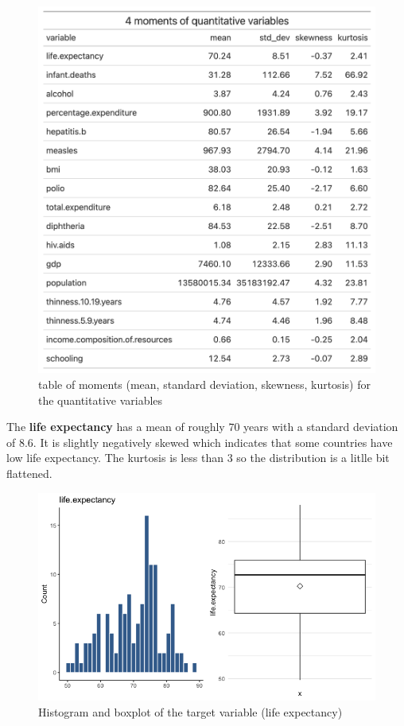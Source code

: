 \begin{figure}[H]
	\centering
	\includegraphics{figures/eda/quantitative_variables_moments.png}
	\caption{table of moments (mean, standard deviation, skewness, kurtosis) for the quantitative variables}
	\label{fig:quantitative_variables_moments}
\end{figure}

The \textbf{life expectancy} has a mean of roughly $70$ years with a standard deviation of $8.6$. It is slightly negatively skewed which indicates that some countries have low life expectancy. The kurtosis is less than $3$ so the distribution is a litlle bit flattened.


\begin{figure}[H]
	\centering
	\includegraphics{figures/eda/histogram_boxplot_target.png}
	\caption{Histogram and boxplot of the target variable (life expectancy)}
	\label{fig:histogram_boxplot_target}
\end{figure}

